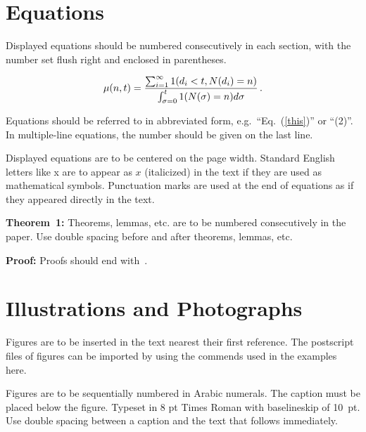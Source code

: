 \documentclass[twoside]{article}
\begin{document}
\section{Equations}
\noindent
Displayed equations should be numbered consecutively in each
section, with the number set flush right and enclosed in
parentheses.

\begin{equation}
\mu(n, t) = {
\sum^\infty_{i=1} 1(d_i < t, N(d_i) = n) \over \int^t_{\sigma=0} 1(N(\sigma) 
= n)d\sigma}\,. \label{this}
\end{equation}

Equations should be referred to in abbreviated form,
e.g.~``Eq.~(\ref{this})'' or ``(2)''. In multiple-line
equations, the number should be given on the last line.

Displayed equations are to be centered on the page width.
Standard English letters like x are to appear as $x$
(italicized) in the text if they are used as mathematical
symbols. Punctuation marks are used at the end of equations as
if they appeared directly in the text.

\vspace*{12pt}
\noindent
{\bf Theorem~1:} Theorems, lemmas, etc. are to be numbered
consecutively in the paper. Use double spacing before and after
theorems, lemmas, etc.

\vspace*{12pt}
\noindent
{\bf Proof:} Proofs should end with \square\,.

\section{Illustrations and Photographs}
\noindent
Figures are to be inserted in the text nearest their first
reference. The postscript files of figures can be imported by using
the commends used in the examples here.

\begin{figure} [htbp]
\centerline{} %
\vspace*{13pt}
\end{figure}

Figures are to be sequentially numbered in Arabic numerals. The
caption must be placed below the figure. Typeset in 8 pt Times
Roman with baselineskip of 10~pt. Use double spacing between a
caption and the text that follows immediately.
\end{document}
